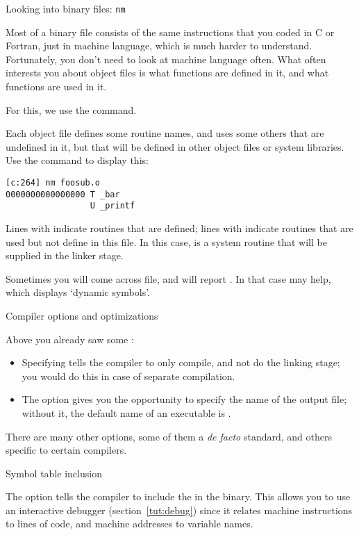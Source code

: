  {Looking into binary files: \texttt{nm}}

Most of a binary file consists of the same instructions that you
coded in C or Fortran, just in machine language, which
is much harder to understand.
Fortunately, you don't need to look at machine language often.
What often interests you about object files is what functions are
defined in it, and what functions are used in it.

For this, we use the  command.

Each object file defines some routine names, and uses some others that
are undefined in it, but that will be defined in other object files or
system libraries. Use the  command to display
this:
\begin{verbatim}
[c:264] nm foosub.o
0000000000000000 T _bar
                 U _printf
\end{verbatim}
Lines with  indicate routines that are defined; lines with 
indicate routines that are used but not define in this file. In this
case,  is a system routine that will be supplied in the
linker stage.

Sometimes you will come across  file,
and  will report .
In that case  may help, which displays `dynamic symbols'.

 {Compiler options and optimizations}

Above you already saw some :
\begin{itemize}
\item Specifying  tells the compiler to only compile, and not do
  the linking stage; you would do this in case of separate
  compilation.
\item The option  gives you the opportunity to specify the name
  of the output file; without it, the default name of an executable is
  .
\end{itemize}

There are many other options, some of them a \emph{de facto} standard,
and others specific to certain compilers.

 {Symbol table inclusion}

The  option tells the compiler to include the  in the binary.  This allows you to use an interactive
debugger (section~\ref{tut:debug}) since it relates machine
instructions to lines of code, and machine addresses to variable
names.

